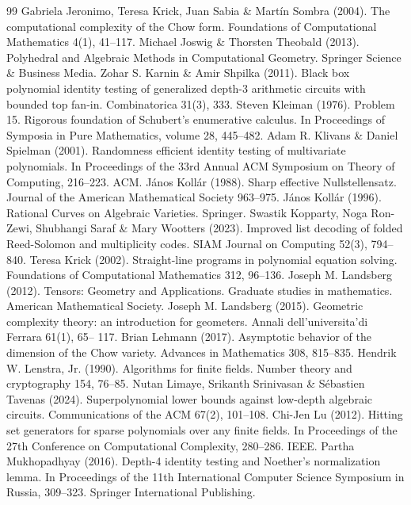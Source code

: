 \documentclass[10pt,a4paper]{article}
\begin{document}
\begin{thebibliography}{99}
 Gabriela Jeronimo, Teresa Krick, Juan Sabia \& Martín Sombra (2004). The computational complexity of the Chow form. Foundations of Computational Mathematics 4(1), 41–117.
 Michael Joswig \& Thorsten Theobald (2013). Polyhedral and Algebraic Methods in Computational Geometry. Springer Science \& Business Media.
 Zohar S. Karnin \& Amir Shpilka (2011). Black box polynomial identity testing of generalized depth-3 arithmetic circuits with bounded top fan-in. Combinatorica 31(3), 333.
 Steven Kleiman (1976). Problem 15. Rigorous foundation of Schubert’s enumerative calculus. In Proceedings of Symposia in Pure Mathematics, volume 28, 445–482.
 Adam R. Klivans \& Daniel Spielman (2001). Randomness efficient identity testing of multivariate polynomials. In Proceedings of the 33rd Annual ACM Symposium on Theory of Computing, 216–223. ACM.
 János Kollár (1988). Sharp effective Nullstellensatz. Journal of the American Mathematical Society 963–975.
 János Kollár (1996). Rational Curves on Algebraic Varieties. Springer.
 Swastik Kopparty, Noga Ron-Zewi, Shubhangi Saraf \& Mary Wootters (2023). Improved list decoding of folded Reed-Solomon and multiplicity codes. SIAM Journal on Computing 52(3), 794–840.
 Teresa Krick (2002). Straight-line programs in polynomial equation solving. Foundations of Computational Mathematics 312, 96–136.
 Joseph M. Landsberg (2012). Tensors: Geometry and Applications. Graduate studies in mathematics. American Mathematical Society.
 Joseph M. Landsberg (2015). Geometric complexity theory: an introduction for geometers. Annali dell’universita’di Ferrara 61(1), 65– 117.
 Brian Lehmann (2017). Asymptotic behavior of the dimension of the Chow variety. Advances in Mathematics 308, 815–835.
 Hendrik W. Lenstra, Jr. (1990). Algorithms for finite fields. Number theory and cryptography 154, 76–85.
 Nutan Limaye, Srikanth Srinivasan \& Sébastien Tavenas (2024). Superpolynomial lower bounds against low-depth algebraic circuits. Communications of the ACM 67(2), 101–108.
 Chi-Jen Lu (2012). Hitting set generators for sparse polynomials over any finite fields. In Proceedings of the 27th Conference on Computational Complexity, 280–286. IEEE.
 Partha Mukhopadhyay (2016). Depth-4 identity testing and Noether’s normalization lemma. In Proceedings of the 11th International Computer Science Symposium in Russia, 309–323. Springer International Publishing.

\end{thebibliography}
\end{document}
